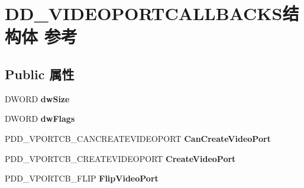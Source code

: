 \hypertarget{struct_d_d___v_i_d_e_o_p_o_r_t_c_a_l_l_b_a_c_k_s}{}\section{D\+D\+\_\+\+V\+I\+D\+E\+O\+P\+O\+R\+T\+C\+A\+L\+L\+B\+A\+C\+K\+S结构体 参考}
\label{struct_d_d___v_i_d_e_o_p_o_r_t_c_a_l_l_b_a_c_k_s}
\subsection*{Public 属性}
\begin{DoxyCompactItemize}
\item 
\mbox{\label{struct_d_d___v_i_d_e_o_p_o_r_t_c_a_l_l_b_a_c_k_s_a73148992e1a920a1ef090a8fdaf0fd25}} 
D\+W\+O\+RD {\bfseries dw\+Size}
\item 
\mbox{\label{struct_d_d___v_i_d_e_o_p_o_r_t_c_a_l_l_b_a_c_k_s_a37b2120d84caf7485bed9f729ebf3439}} 
D\+W\+O\+RD {\bfseries dw\+Flags}
\item 
\mbox{\label{struct_d_d___v_i_d_e_o_p_o_r_t_c_a_l_l_b_a_c_k_s_a21504c81b72fd60447a3f3ebf3189209}} 
P\+D\+D\+\_\+\+V\+P\+O\+R\+T\+C\+B\+\_\+\+C\+A\+N\+C\+R\+E\+A\+T\+E\+V\+I\+D\+E\+O\+P\+O\+RT {\bfseries Can\+Create\+Video\+Port}
\item 
\mbox{\label{struct_d_d___v_i_d_e_o_p_o_r_t_c_a_l_l_b_a_c_k_s_a9d7d0e76abf4014a746095f5f5275d3f}} 
P\+D\+D\+\_\+\+V\+P\+O\+R\+T\+C\+B\+\_\+\+C\+R\+E\+A\+T\+E\+V\+I\+D\+E\+O\+P\+O\+RT {\bfseries Create\+Video\+Port}
\item 
\mbox{\label{struct_d_d___v_i_d_e_o_p_o_r_t_c_a_l_l_b_a_c_k_s_a9f2a3499abaa7d07914891c42eb95b79}} 
P\+D\+D\+\_\+\+V\+P\+O\+R\+T\+C\+B\+\_\+\+F\+L\+IP {\bfseries Flip\+Video\+Port}
\item 
\mbox{\label{struct_d_d___v_i_d_e_o_p_o_r_t_c_a_l_l_b_a_c_k_s_a23d76c5e837ec57ab8db55be99d70b4f}} 

\end{DoxyCompactItemize}

